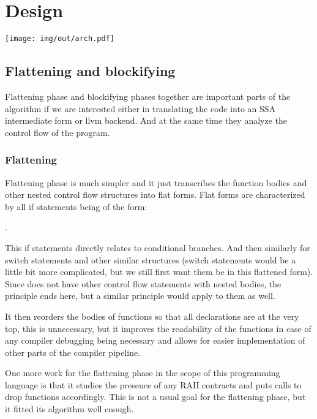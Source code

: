 \chapter{Design}



\texttt{[image: img/out/arch.pdf]}

\section{Flattening and blockifying}

Flattening phase and blockifying phases together are important parts of the algorithm if we are interested either in translating the code into an SSA intermediate form or llvm backend. And at the same time they analyze the control flow of the program.

\subsection{Flattening}

Flattening phase is much simpler and it just transcribes the function bodies and other nested control flow structures into flat forms. Flat forms are characterized by all if statements being of the form:

.

This if statements directly relates to conditional branches. And then similarly for switch statements and other similar structures (switch statements would be a little bit more complicated, but we still first want them be in this flattened form). Since \cmm does not have other control flow statements with nested bodies, the principle ends here, but a similar principle would apply to them as well.

It then reorders the bodies of functions so that all declarations are at the very top, this is unnecessary, but it improves the readability of the functions in case of any compiler debugging being necessary and allows for easier implementation of other parts of the compiler pipeline.

One more work for the flattening phase in the scope of this programming language is that it studies the presence of any RAII contracts and puts calls to drop functions accordingly. This is not a usual goal for the flattening phase, but it fitted its algorithm well enough.


